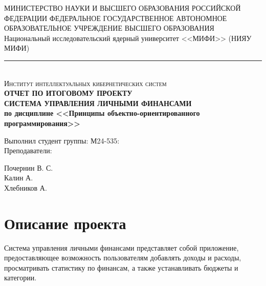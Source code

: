 \documentclass[a4paper, 14pt]{article}
\def\Year{\expandafter\YEAR\the\year}
\def\YEAR#1#2#3#4{#1#2#3#4}
\begin{document}
\begin{titlepage}
	\center
	МИНИСТЕРСТВО НАУКИ И ВЫСШЕГО ОБРАЗОВАНИЯ РОССИЙСКОЙ ФЕДЕРАЦИИ\linebreak
	ФЕДЕРАЛЬНОЕ ГОСУДАРСТВЕННОЕ АВТОНОМНОЕ ОБРАЗОВАТЕЛЬНОЕ УЧРЕЖДЕНИЕ ВЫСШЕГО ОБРАЗОВАНИЯ\linebreak
	Национальный исследовательский ядерный университет <<МИФИ>> (НИЯУ МИФИ)
	\noindent\rule{500pt}{0.8pt} \\
	\textsc{\Large Институт интеллектуальных кибернетических систем}\\[8.5cm]

	{ \huge \bfseries ОТЧЕТ ПО ИТОГОВОМУ ПРОЕКТУ	\\
	\Large \mdseries СИСТЕМА УПРАВЛЕНИЯ ЛИЧНЫМИ ФИНАНСАМИ \\
	\large по дисциплине <<Принципы объектно-ориентированного программирования>>}\\[7.0cm]


	\begin{multicols}{2}
		\begin{flushright} \large

			{Выполнил студент группы: М24-535:}\\[0.5cm]

			{Преподаватели:\\}

		\end{flushright}
		\begin{flushright}

			{Почернин В. С.}\\[0.5cm]


			Калин А.\\
			Хлебников А.

		\end{flushright}
	\end{multicols}

	\flushright{
		{\today}\\[0.5cm]
	}
	\centering{
		Санкт-Петербург\\
		\Year
	}

	\vfill
\end{titlepage}

\large
\tableofcontents

\newpage
\section{Описание проекта}

Система управления личными финансами представляет собой приложение, предоставляющее возможность пользователям добавлять доходы и расходы, просматривать статистику по финансам, а также устанавливать бюджеты и категории.
\end{document}
